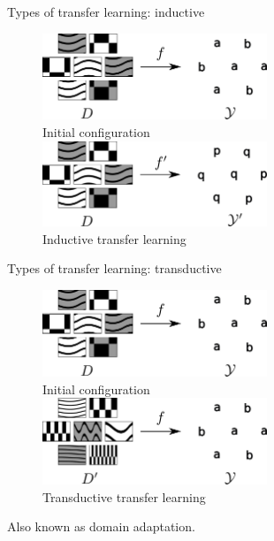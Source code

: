 \documentclass[xcolor=pdftex,dvipsnames,table,mathserif]{beamer}
\begin{document}
\begin{frame}{Types of transfer learning: inductive}

\begin{figure}[ht]
  \centering
  \includegraphics[width=0.6\textwidth]{tl_0}\\
  Initial configuration\\
  \vspace{2em}
  \includegraphics[width=0.6\textwidth]{tl_inductive}\\
  Inductive transfer learning
\end{figure}


\end{frame}



\begin{frame}{Types of transfer learning: transductive}

\begin{figure}[ht]
  \centering
  \includegraphics[width=0.6\textwidth]{tl_0}\\
  Initial configuration\\
  \vspace{2em}
  \includegraphics[width=0.6\textwidth]{tl_transductive}\\
  Transductive transfer learning
\end{figure}

\begin{alertblock}{}
  Also known as domain adaptation.
\end{alertblock}

\end{frame}
\end{document}
